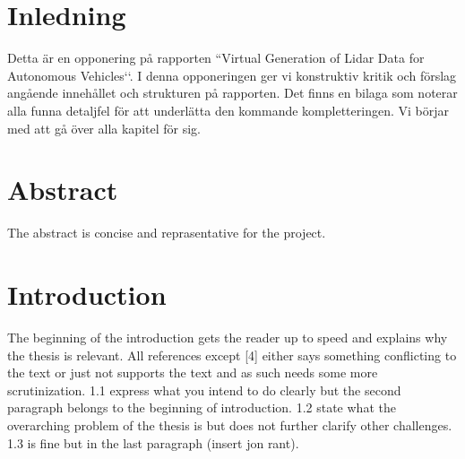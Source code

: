 \documentclass[12pt,a4paper,twoside,openright]{report}
\begin{document}
 


\newcommand{\varHeadline}{Opponering av DATX02-17-10}
\newcommand{\varSubtitle}{Av DATX02-17-12}
\newcommand{\varDepartment}{Department of Computer Science and Engineering}
\newcommand{\varNames}{André Perzon, Björn Strömberg, Chi Thong Luong,  \\
Elias Forsberg, Jesper Åberg, Jon Johnsson}




\section*{Inledning}

	Detta är en opponering på rapporten ``Virtual Generation of Lidar Data for
	Autonomous Vehicles‘‘. I denna opponeringen ger vi konstruktiv kritik och
	förslag angående innehållet och strukturen på rapporten. Det finns en
	bilaga som noterar alla funna detaljfel för att underlätta den kommande
	kompletteringen. Vi börjar med att gå över alla kapitel för sig. 

\section*{Abstract}

	The abstract is concise and reprasentative for the project.

\section*{Introduction}

	The beginning of the introduction gets the reader up to speed and explains
	why the thesis is relevant. All references except [4] either says something
	conflicting to the text or just not supports the text and as such needs
	some more scrutinization. 1.1 express what you intend to do clearly but the
	second paragraph belongs to the beginning of introduction. 1.2 state what
	the overarching problem of the thesis is but does not further clarify other
	challenges. 1.3 is fine but in the last paragraph (insert jon rant).
\end{document}
